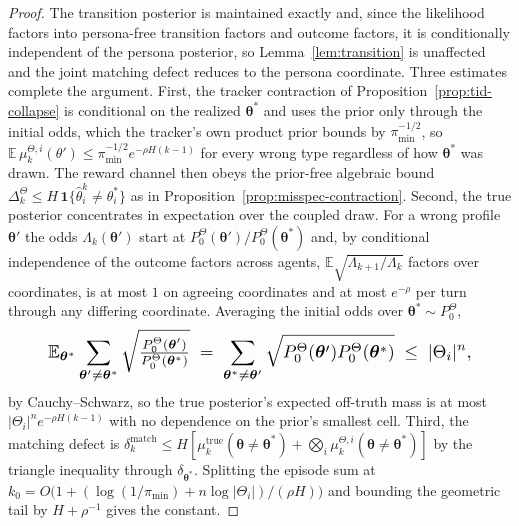 \begin{proof}
The transition posterior is maintained exactly and, since the likelihood factors into persona-free transition factors and outcome factors, it is conditionally independent of the persona posterior, so Lemma~\ref{lem:transition} is unaffected and the joint matching defect reduces to the persona coordinate. Three estimates complete the argument. First, the tracker contraction of Proposition~\ref{prop:tid-collapse} is conditional on the realized $\boldsymbol\theta^*$ and uses the prior only through the initial odds, which the tracker's own product prior bounds by $\pi_{\min}^{-1/2}$, so $\mathbb{E}\,\mu_k^{\Theta,i}(\theta')\le\pi_{\min}^{-1/2}e^{-\rho H(k-1)}$ for every wrong type regardless of how $\boldsymbol\theta^*$ was drawn. The reward channel then obeys the prior-free algebraic bound $\Delta_k^\Theta\le H\,\mathbf 1\{\hat\theta_i^k\neq\theta_i^*\}$ as in Proposition~\ref{prop:misspec-contraction}. Second, the true posterior concentrates in expectation over the coupled draw. For a wrong profile $\boldsymbol\theta'$ the odds $\Lambda_k(\boldsymbol\theta')$ start at $P_0^\Theta(\boldsymbol\theta')/P_0^\Theta(\boldsymbol\theta^*)$ and, by conditional independence of the outcome factors across agents, $\mathbb{E}\sqrt{\Lambda_{k+1}/\Lambda_k}$ factors over coordinates, is at most $1$ on agreeing coordinates and at most $e^{-\rho}$ per turn through any differing coordinate. Averaging the initial odds over $\boldsymbol\theta^*\sim P_0^\Theta$,
\begin{equation*}\resizebox{0.88\linewidth}{!}{$\displaystyle
\mathbb{E}_{\boldsymbol\theta^*}\sum_{\boldsymbol\theta'\neq\boldsymbol\theta^*}\sqrt{\tfrac{P_0^\Theta(\boldsymbol\theta')}{P_0^\Theta(\boldsymbol\theta^*)}}\;=\;\sum_{\boldsymbol\theta^*\neq\boldsymbol\theta'}\sqrt{P_0^\Theta(\boldsymbol\theta')P_0^\Theta(\boldsymbol\theta^*)}\;\le\;|\Theta_i|^n, $}
\end{equation*}
by Cauchy--Schwarz, so the true posterior's expected off-truth mass is at most $|\Theta_i|^n e^{-\rho H(k-1)}$ with no dependence on the prior's smallest cell. Third, the matching defect is $\delta_k^{\mathrm{match}}\le H[\mu_k^{\mathrm{true}}(\boldsymbol\theta\neq\boldsymbol\theta^*)+\bigotimes_i\mu_k^{\Theta,i}(\boldsymbol\theta\neq\boldsymbol\theta^*)]$ by the triangle inequality through $\delta_{\boldsymbol\theta^*}$. Splitting the episode sum at $k_0=O\big(1+(\log(1/\pi_{\min})+n\log|\Theta_i|)/(\rho H)\big)$ and bounding the geometric tail by $H+\rho^{-1}$ gives the constant.
\end{proof}

